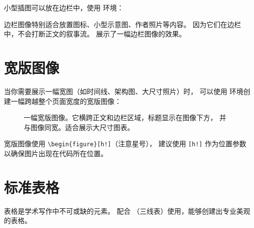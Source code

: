 小型插图可以放在边栏中，使用  环境：

\begin{marginfigure}
    \centering
    \caption[边栏图像示例]{一幅边栏图像。注意其宽度被限制在边栏宽度
    （约 47.7 mm）以内。}
\end{marginfigure}

边栏图像特别适合放置图标、小型示意图、作者照片等内容。
因为它们在边栏中，不会打断正文的叙事流。
展示了一幅边栏图像的效果。


\section{宽版图像}

当你需要展示一幅宽图（如时间线、架构图、大尺寸照片）时，
可以使用  环境创建一幅跨越整个页面宽度的宽版图像：

\begin{figure}[h!]
    \RawFloats%
    \centering
    \caption[宽版图像示例]{一幅宽版图像。它横跨正文和边栏区域，标题显示在图像下方，
    并与图像同宽。适合展示大尺寸图表。}
\end{figure}

宽版图像使用 \lstinline|\begin{figure}[h!]|（注意星号），
建议使用 \texttt{[h!]} 作为位置参数以确保图片出现在代码所在位置。

\section{标准表格}

表格是学术写作中不可或缺的元素。 配合
（三线表）使用，能够创建出专业美观的表格。

